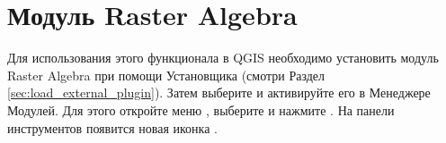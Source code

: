 
\section{Модуль Raster Algebra}\label{sec:ftools}



Для использования этого функционала в QGIS необходимо установить модуль
Raster Algebra при помощи  Установщика
(смотри Раздел \ref{sec:load_external_plugin}). Затем выберите и активируйте
его в Менеджере Модулей. Для этого откройте меню  \arrow
{}, выберите  и
нажмите . На панели инструментов появится новая иконка
.
